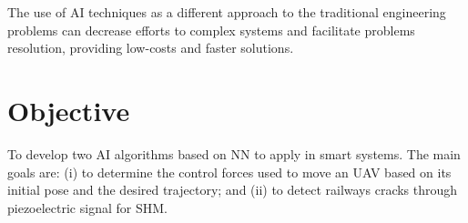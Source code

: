 The use of AI techniques as a different approach to the traditional engineering problems can decrease efforts to complex systems and facilitate problems resolution, providing low-costs and faster solutions. 

\section{Objective}

To develop two AI algorithms based on NN to apply in smart systems.
The main goals are: (i) to determine the control forces used to move an UAV based on its initial pose and the desired trajectory; and (ii) to detect railways cracks through piezoelectric signal for SHM.
